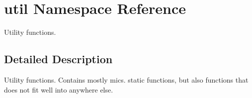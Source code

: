 \hypertarget{namespaceutil}{\section{util Namespace Reference}
\label{namespaceutil}
}


Utility functions.  




\subsection{Detailed Description}
Utility functions. Contains mostly mics. static functions, but also functions that does not fit well into anywhere else. 